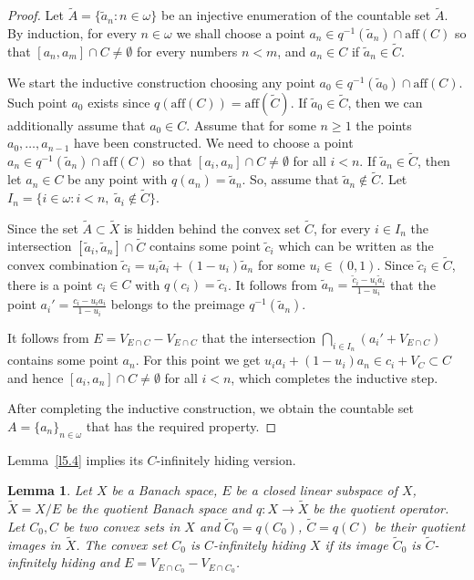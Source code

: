 \documentclass{amsart}
\newcommand{\w}{\omega}
\newcommand{\aff}{\mathrm{aff}}
\newtheorem{lemma}[theorem]{Lemma}
\theoremstyle{definition}
\begin{document}
\begin{proof} Let $\tilde A=\{\tilde a_n:n\in\w\}$ be an injective enumeration of the countable set $\tilde A$. By induction, for every $n\in\w$ we shall choose a point $a_n\in q^{-1}(\tilde a_n)\cap\aff(C)$ so that $[a_n,a_m]\cap C\ne\emptyset$ for every numbers $n<m$, and $a_n\in C$ if $\tilde a_n\in \tilde C$.

We start the inductive construction choosing any point $a_0\in q^{-1}(\tilde a_0)\cap\aff(C)$. Such point $a_0$ exists since $q(\aff(C))=\aff(\tilde C)$. If $\tilde a_0\in \tilde C$, then we can additionally assume that $a_0\in C$.  Assume that for some $n\ge 1$ the points $a_0,\dots,a_{n-1}$ have been constructed. We need to choose a point $a_n\in q^{-1}(\tilde a_n)\cap\aff(C)$ so that $[a_i,a_n]\cap C\ne\emptyset$ for all $i<n$. If $\tilde a_n\in\tilde C$, then let $a_n\in C$ be any point with $q(a_n)=\tilde a_n$. So, assume that $\tilde a_n\notin \tilde C$.
Let $I_n=\{i\in \w:i<n,\;\tilde a_i\notin\tilde C\}$.

Since the set $\tilde A\subset\tilde X$ is hidden behind the convex set $\tilde C$, for every $i\in I_n$ the intersection $[\tilde a_i,\tilde a_n]\cap \tilde C$ contains some point $\tilde c_i$ which can be written as the convex combination $\tilde c_i=u_i\tilde a_i+(1-u_i)\tilde a_n$ for some $u_i\in(0,1)$. Since $\tilde c_i\in \tilde C$, there is a point $c_i\in C$ with $q(c_i)=\tilde c_i$. It follows from $\tilde a_n=\frac{\tilde c_i-u_i\tilde a_i}{1-u_i}$ that the point $a_i'=\frac{c_i-u_ia_i}{1-u_i}$ belongs to the preimage $q^{-1}(\tilde a_n)$.

It follows from $E=V_{E\cap C}-V_{E\cap C}$ that the intersection $\bigcap_{i\in I_n}(a_i'+V_{E\cap C})$ contains some point $a_n$. For this point we get $u_ia_i+(1-u_i)a_n\in c_i+V_{C}\subset C$ and hence $[a_i,a_n]\cap C\ne\emptyset$ for all $i<n$, which completes the inductive step.

After completing the inductive construction, we obtain the countable set $A=\{a_n\}_{n\in\w}$ that has the required property.
\end{proof}

Lemma~\ref{l5.4} implies its $C$-infinitely hiding version.

\begin{lemma}\label{l5.5} Let $X$ be a Banach space, $E$ be a closed linear subspace of $X$, $\tilde X=X/E$ be the quotient Banach space and $q:X\to \tilde X$ be the quotient operator. Let $C_0,C$ be two convex sets in $X$ and $\tilde C_0=q(C_0)$, $\tilde C=q(C)$ be their quotient images in $\tilde X$.
The convex set $C_0$ is $C$-infinitely hiding $X$ if its image $\tilde C_0$ is $\tilde C$-infinitely hiding and $E=V_{E\cap C_0}-V_{E\cap C_0}$.
\end{lemma}
\end{document}
